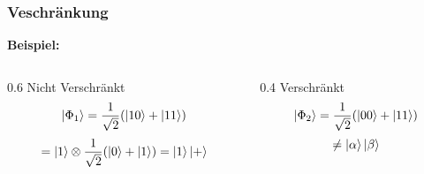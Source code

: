 \begin{frame}
    \frametitle{Veschränkung}
    \textbf{Beispiel:}

    \hfil

    \begin{columns}[c]
        \begin{column}{0.6\hsize}\centering
        Nicht Verschränkt
        $$\ket{\Phi_1} = \frac{1}{\sqrt{2}} ( \ket{10} + \ket{11})$$
        $$= \ket{1}\otimes \frac{1}{\sqrt{2}} ( \ket{0} + \ket{1})= \ket{1} \ket{+}$$
        \end{column}

        \begin{column}{0.4\hsize}
        Verschränkt
        $$\ket{\Phi_2} = \frac{1}{\sqrt{2}} ( \ket{00} + \ket{11})$$
        $$\neq \ket{\alpha}\ket{\beta}$$

        \end{column}
    \end{columns}

\end{frame}